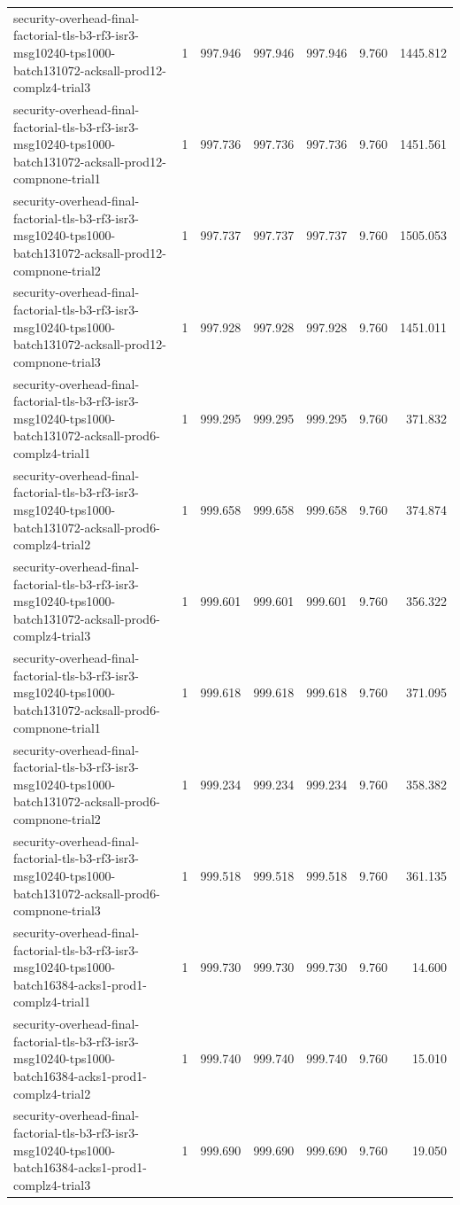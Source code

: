 \begin{tabular}{lrrrrrr}
security-overhead-final-factorial-tls-b3-rf3-isr3-msg10240-tps1000-batch131072-acksall-prod12-complz4-trial3 & 1 & 997.946 & 997.946 & 997.946 & 9.760 & 1445.812 \\
security-overhead-final-factorial-tls-b3-rf3-isr3-msg10240-tps1000-batch131072-acksall-prod12-compnone-trial1 & 1 & 997.736 & 997.736 & 997.736 & 9.760 & 1451.561 \\
security-overhead-final-factorial-tls-b3-rf3-isr3-msg10240-tps1000-batch131072-acksall-prod12-compnone-trial2 & 1 & 997.737 & 997.737 & 997.737 & 9.760 & 1505.053 \\
security-overhead-final-factorial-tls-b3-rf3-isr3-msg10240-tps1000-batch131072-acksall-prod12-compnone-trial3 & 1 & 997.928 & 997.928 & 997.928 & 9.760 & 1451.011 \\
security-overhead-final-factorial-tls-b3-rf3-isr3-msg10240-tps1000-batch131072-acksall-prod6-complz4-trial1 & 1 & 999.295 & 999.295 & 999.295 & 9.760 & 371.832 \\
security-overhead-final-factorial-tls-b3-rf3-isr3-msg10240-tps1000-batch131072-acksall-prod6-complz4-trial2 & 1 & 999.658 & 999.658 & 999.658 & 9.760 & 374.874 \\
security-overhead-final-factorial-tls-b3-rf3-isr3-msg10240-tps1000-batch131072-acksall-prod6-complz4-trial3 & 1 & 999.601 & 999.601 & 999.601 & 9.760 & 356.322 \\
security-overhead-final-factorial-tls-b3-rf3-isr3-msg10240-tps1000-batch131072-acksall-prod6-compnone-trial1 & 1 & 999.618 & 999.618 & 999.618 & 9.760 & 371.095 \\
security-overhead-final-factorial-tls-b3-rf3-isr3-msg10240-tps1000-batch131072-acksall-prod6-compnone-trial2 & 1 & 999.234 & 999.234 & 999.234 & 9.760 & 358.382 \\
security-overhead-final-factorial-tls-b3-rf3-isr3-msg10240-tps1000-batch131072-acksall-prod6-compnone-trial3 & 1 & 999.518 & 999.518 & 999.518 & 9.760 & 361.135 \\
security-overhead-final-factorial-tls-b3-rf3-isr3-msg10240-tps1000-batch16384-acks1-prod1-complz4-trial1 & 1 & 999.730 & 999.730 & 999.730 & 9.760 & 14.600 \\
security-overhead-final-factorial-tls-b3-rf3-isr3-msg10240-tps1000-batch16384-acks1-prod1-complz4-trial2 & 1 & 999.740 & 999.740 & 999.740 & 9.760 & 15.010 \\
security-overhead-final-factorial-tls-b3-rf3-isr3-msg10240-tps1000-batch16384-acks1-prod1-complz4-trial3 & 1 & 999.690 & 999.690 & 999.690 & 9.760 & 19.050 \\

\end{tabular}
